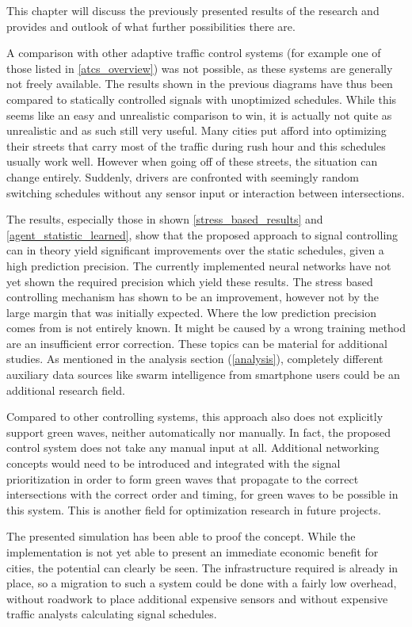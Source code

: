 This chapter will discuss the previously presented results of the research and provides and outlook of what further possibilities there are.

A comparison with other adaptive traffic control systems (for example one of those listed in \autoref{atcs_overview}) was not possible, as these systems are generally not freely available. The results shown in the previous diagrams have thus been compared to statically controlled signals with unoptimized schedules. While this seems like an easy and unrealistic comparison to win, it is actually not quite as unrealistic and as such still very useful. Many cities put afford into optimizing their streets  that carry most of the traffic during rush hour and this schedules usually work well. However when going off of these streets, the situation can change entirely. Suddenly, drivers are confronted with seemingly random switching schedules without any sensor input or interaction between intersections.

The results, especially those in shown \autoref{stress_based_results} and \autoref{agent_statistic_learned}, show that the proposed approach to signal controlling can in theory yield significant improvements over the static schedules, given a high prediction precision. The currently implemented neural networks have not yet shown the required precision which yield these results. The stress based controlling mechanism has shown to be an improvement, however not by the large margin that was initially expected. Where the low prediction precision comes from is not entirely known. It might be caused by a wrong training method are an insufficient error correction. These topics can be material for additional studies. As mentioned in the analysis section (\autoref{analysis}), completely different auxiliary data sources like swarm intelligence from smartphone users could be an additional research field.

Compared to other controlling systems, this approach also does not explicitly support green waves, neither automatically nor manually. In fact, the proposed control system does not take any manual input at all. Additional networking concepts would need to be introduced and integrated with the signal prioritization in order to form green waves that propagate to the correct intersections with the correct order and timing, for green waves to be possible in this system. This is another field for optimization research in future projects.

The presented simulation has been able to proof the concept. While the implementation is not yet able to present an immediate economic benefit for cities, the potential can clearly be seen. The infrastructure required is already in place, so a migration to such a system could be done with a fairly low overhead, without roadwork to place additional expensive sensors and without expensive traffic analysts calculating signal schedules.


